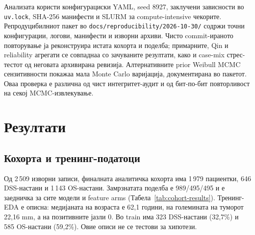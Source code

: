 \documentclass[12pt]{article}
\begin{document}
Анализата користи конфигурациски YAML, seed 8927, заклучени зависности во
\texttt{uv.lock}, SHA-256 манифести и SLURM за compute-intensive чекорите.
Репродуцибилниот пакет во \texttt{docs/reproducibility/2026-10-30/} содржи
точни конфигурации, логови, манифести и изворни архиви. Чисто commit-ираното
повторување ја реконструира истата кохорта и поделба; примарните, Qin и
reliability агрегати се совпаднаа со зачуваните резултати, како и case-mix
стрес-тестот од неговата архивирана ревизија. Алтернативните prior Weibull MCMC
сензитивности покажаа мала Monte Carlo варијација, документирана во пакетот.
Оваа проверка е различна од чист интегритет-аудит и од бит-по-бит повторливост
на секој MCMC-извлекување.

\section{Резултати}

\subsection{Кохорта и тренинг-податоци}

Од 2\,509 изворни записи, финалната аналитичка кохорта има 1\,979 пациентки,
646 DSS-настани и 1\,143 OS-настани. Замрзнатата поделба е 989/495/495 и е
заедничка за сите модели и feature arms (Табела~\ref{tab:cohort-results}).
Тренинг-EDA е описна: медијаната на возраста е 62,1 години, на големината на
туморот 22,16 mm, а на позитивните јазли 0. Во train има 323 DSS-настани
(32,7\%) и 585 OS-настани (59,2\%). Овие описи не се тестови за хипотези.
\end{document}

